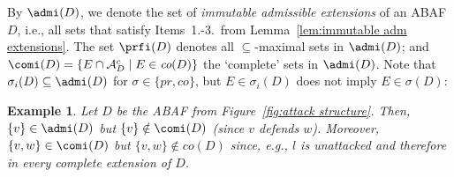 \documentclass[letterpaper]{article} %
\newcommand{\TODO}[1]{\todo[inline]{ #1}}
\newcommand{\com}{\textit{co}}
\newcommand{\prf}{\textit{pr}}
\newcommand{\asm}{\ensuremath{\mathcal{A}}}
\newcommand{\contraryAF}[1]{F^{c}_{#1}}
\newcommand{\contraryArgs}[1]{\asm^{c}_{#1}}
\newcommand{\Xpos}{\mathcal{X}^{pos}}
\newcommand{\Xneg}{\mathcal{X}^{neg}}
\newtheorem{example}{Example}[section]
\newtheorem{definition}[example]{Definition}
\newtheorem{lemma}[example]{Lemma}
\begin{document}
By $\admi(D)$, we denote the set of \emph{immutable admissible extensions} of an ABAF $D$, i.e., all sets 
that satisfy Items~1.-3.\ from Lemma~\ref{lem:immutable adm extensions}. 
The set $\prfi(D)$
denotes all $\subseteq$-maximal sets in $\admi(D)$; and
$\comi(D)=\{ E\cap \contraryArgs{D} \mid E\in \com(D)\}$ the `complete' sets in $\admi(D)$.
Note that $\sigma_i(D)\subseteq \admi(D)$ for $\sigma\in\{\prf,\com\}$, but $E\in \sigma_i(D)$ does not imply $E\in \sigma(D)$:%
\begin{example}
    Let $D$ be the ABAF from Figure~\ref{fig:attack structure}. Then, $\{v\}\in\admi(D)$ but $\{v\}\notin \comi(D)$ (since $v$ defends $w$).
    Moreover, $\{v,w\}\in \comi(D)$ but $\{v,w\}\notin \com(D)$ since, e.g., $l$ is unattacked and therefore in every complete extension of $D$.
\end{example}






\end{document}
